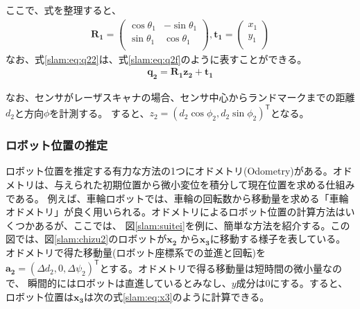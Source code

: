 ここで、式を整理すると、
\begin{align}
  \bm{R_1} = 
  \begin{pmatrix}
    \cos\theta_1&-\sin\theta_1\\
    \sin\theta_1&\cos\theta_1\\
  \end{pmatrix},
  \bm{t_1} =
  \begin{pmatrix}
    x_1\\
    y_1\\
  \end{pmatrix}\label{slam:eq:q22}
\end{align}
なお、式\eqref{slam:eq:q22}は、式\eqref{slam:eq:q2f}のように表すことができる。
\begin{align}
  \bm{q_2} = \bm{R_1}\bm{z_2}+\bm{t_1} \label{slam:eq:q2f}
\end{align}

なお、センサがレーザスキャナの場合、センサ中心からランドマークまでの距離$d_2$と方向$\phi$を計測する。
すると、$z_2 = (d_2\cos\phi_2,d_2\sin\phi_2)^{\mathsf{T}}$となる。

\subsubsection{ロボット位置の推定}
ロボット位置を推定する有力な方法の1つにオドメトリ(Odometry)がある。オドメトリは、与えられた初期位置から微小変位を積分して現在位置を求める仕組みである。
例えば、車輪ロボットでは、車輪の回転数から移動量を求める「車輪オドメトリ」が良く用いられる。オドメトリによるロボット位置の計算方法はいくつかあるが、ここでは、
図\ref{slam:suitei}を例に、簡単な方法を紹介する。この図では、図\ref{slam:chizu2}のロボットが$\bm{x_2}$ から$\bm{x_3}$に移動する様子を表している。
オドメトリで得た移動量(ロボット座標系での並進と回転)を$\bm{a_2} = (\Delta d_2,0,\Delta\psi_2)^{\mathsf{T}}$とする。オドメトリで得る移動量は短時間の微小量なので、
瞬間的にはロボットは直進しているとみなし、$y$成分は0にする。すると、ロボット位置は$\bm{x_3}$は次の式\eqref{slam:eq:x3}のように計算できる。

